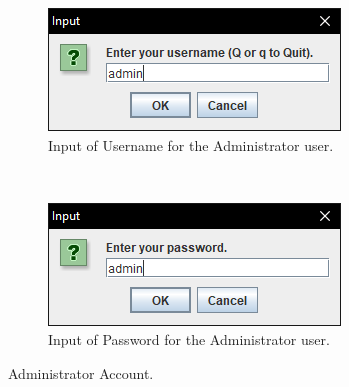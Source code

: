 \documentclass[12pt,twocolumn]{IEEEtran}
\begin{document}
\begin{figure}[h!]
	\centering
	\begin{subfigure}[t]{0.5\textwidth}
		\centering
		\includegraphics[width=0.8\linewidth]{./Resources/adminUser.PNG}
		\caption{Input of Username for the Administrator user.}
	\end{subfigure}%
	~ 
	\begin{subfigure}[t]{0.5\textwidth}
		\centering
		\includegraphics[width=0.8\linewidth]{./Resources/adminPasswd.PNG}
		\caption{Input of Password for the Administrator user.}
	\end{subfigure}
	\caption{Administrator Account.} \label{fig:admin}
\end{figure}
\end{document}

